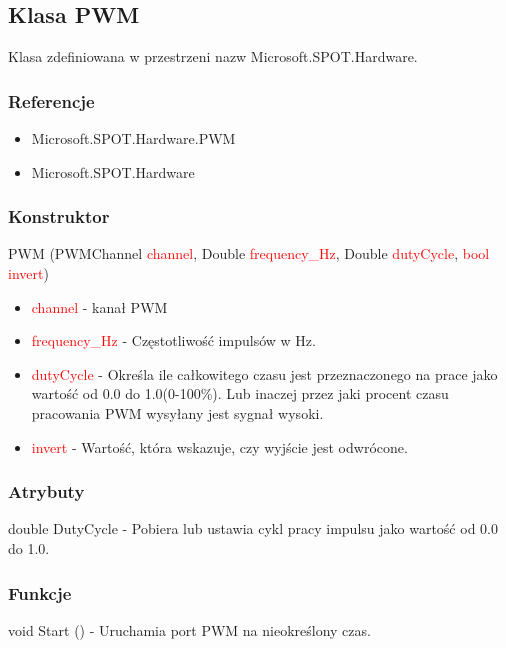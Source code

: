 \documentclass{article}
\begin{document}
\subsection{Klasa PWM}
Klasa zdefiniowana w przestrzeni nazw Microsoft.SPOT.Hardware. 
\subsubsection{Referencje}
\begin{itemize}
\item Microsoft.SPOT.Hardware.PWM
\item Microsoft.SPOT.Hardware
\end{itemize}
\subsubsection{Konstruktor}
PWM (PWMChannel \textcolor{red}{channel}, Double \textcolor{red}{frequency\_Hz}, Double \textcolor{red}{dutyCycle},  \textcolor{red}{bool invert})
\begin{itemize}
\item \textcolor{red}{channel} - kanał PWM
\item \textcolor{red}{frequency\_Hz} - Częstotliwość impulsów w Hz.
\item \textcolor{red}{dutyCycle} - Określa ile całkowitego czasu jest przeznaczonego na prace jako wartość od 0.0 do 1.0(0-100\%). Lub inaczej przez jaki procent czasu pracowania PWM wysyłany jest sygnał wysoki.
\item \textcolor{red}{invert} - Wartość, która wskazuje, czy wyjście jest odwrócone.
\end{itemize}
\subsubsection{Atrybuty}
double DutyCycle - Pobiera lub ustawia cykl pracy impulsu jako wartość od 0.0 do 1.0.
\subsubsection{Funkcje}
void Start () - Uruchamia port PWM na nieokreślony czas.
\end{document}
